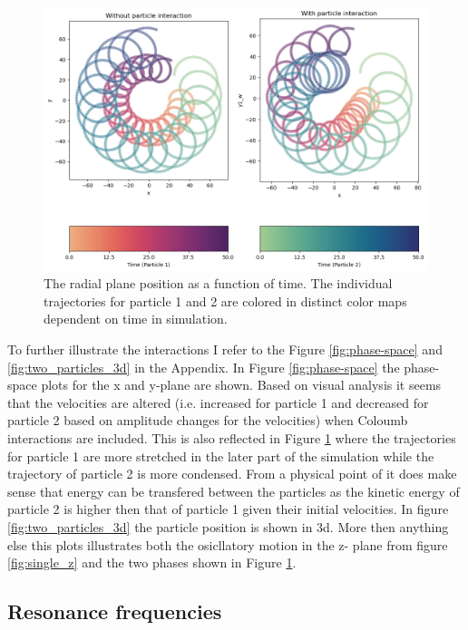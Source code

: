 \documentclass[../main_proj3.tex]{subfiles}
\begin{document}
\begin{figure}[h]
    \centering
    \includegraphics[width=.9\linewidth]{Project 3/figures/two_particles_xy_plane.png}
    \caption{The radial plane position as a function of time. The individual trajectories for particle 1 and 2 are colored in distinct color maps dependent on time in simulation.}
    \label{fig:radial_plane_position}
\end{figure}

To further illustrate the interactions I refer to the Figure \ref{fig:phase-space} and \ref{fig:two_particles_3d} in the Appendix. In Figure \ref{fig:phase-space} the phase-space plots for the x and y-plane are shown. Based on visual analysis it seems that the velocities are altered (i.e. increased for particle 1 and decreased for particle 2 based on amplitude changes for the velocities) when Coloumb interactions are included. This is also reflected in Figure \ref{fig:radial_plane_position} where the trajectories for particle 1 are more stretched in the later part of the simulation while the trajectory of particle 2 is more condensed. From a physical point of it does make sense that energy can be transfered between the particles as the kinetic energy of particle 2 is higher then that of particle 1 given their initial velocities. In figure \ref{fig:two_particles_3d} the particle position is shown in 3d. More then anything else this plots illustrates both the osicllatory motion in the z- plane from figure \ref{fig:single_z} and the two phases shown in Figure \ref{fig:radial_plane_position}. 


\subsection{Resonance frequencies}
\end{document}
